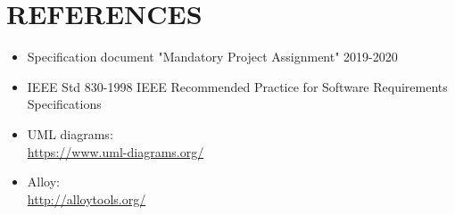 \documentclass[a4paper]{article}
\begin{document}
\section{REFERENCES}\label{references}

\begin{itemize}
\item
  Specification document "Mandatory Project Assignment" 2019-2020
\item
  IEEE Std 830-­1998 IEEE Recommended Practice for Software Requirements
  Specifications
\item
  UML diagrams:\\
  \url{https://www.uml-diagrams.org/}
\item
  Alloy:\\
  \url{http://alloytools.org/}
\end{itemize}
\end{document}

